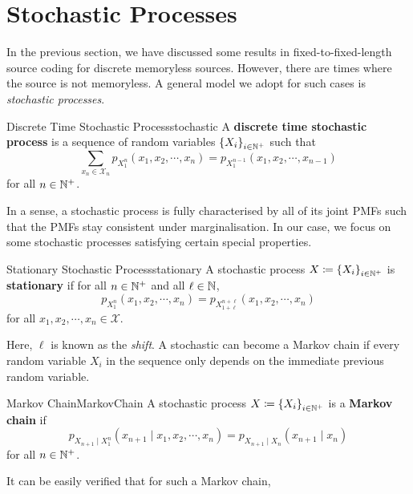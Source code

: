 \documentclass[math]{amznotes}
\theoremstyle{remark}
\begin{document}
\section{Stochastic Processes}
In the previous section, we have discussed some results in fixed-to-fixed-length source coding for discrete memoryless sources. However, there are times where the source is not memoryless. A general model we adopt for such cases is \textit{stochastic processes}.
\begin{dfnbox}{Discrete Time Stochastic Process}{stochastic}
    A {\color{red} \textbf{discrete time stochastic process}} is a sequence of random variables $\left\{X_i\right\}_{i \in \mathbb{N}^+}$ such that 
    \begin{equation*}
        \sum_{x_n \in \mathcal{X}_n}p_{X_1^n}\left(x_1, x_2, \cdots, x_n\right) = p_{X_1^{n - 1}}\left(x_1, x_2, \cdots, x_{n - 1}\right)
    \end{equation*}
    for all $n \in \mathbb{N}^+$.
\end{dfnbox}
In a sense, a stochastic process is fully characterised by all of its joint PMFs such that the PMFs stay consistent under marginalisation. In our case, we focus on some stochastic processes satisfying certain special properties.
\begin{dfnbox}{Stationary Stochastic Process}{stationary}
    A stochastic process $X \coloneqq \left\{X_i\right\}_{i \in \mathbb{N}^+}$ is {\color{red} \textbf{stationary}} if for all $n \in \mathbb{N}^+$ and all $\ell \in \mathbb{N}$, 
    \begin{equation*}
        p_{X_1^n}\left(x_1, x_2, \cdots, x_n\right) = p_{X_{1 + \ell}^{n + \ell}}\left(x_1, x_2, \cdots, x_n\right)
    \end{equation*}
    for all $x_1, x_2, \cdots, x_n \in \mathcal{X}$.
\end{dfnbox}
Here, $\ell$ is known as the \textit{shift}. A stochastic can become a Markov chain if every random variable $X_i$ in the sequence only depends on the immediate previous random variable.
\begin{dfnbox}{Markov Chain}{MarkovChain}
    A stochastic process $X \coloneqq \left\{X_i\right\}_{i \in \mathbb{N}^+}$ is a {\color{red} \textbf{Markov chain}} if 
    \begin{equation*}
        p_{X_{n + 1} \mid X_1^n}\left(x_{n + 1} \mid x_1, x_2, \cdots, x_n\right) = p_{X_{n + 1} \mid X_n}\left(x_{n + 1} \mid x_n\right)
    \end{equation*}
    for all $n \in \mathbb{N}^+$.
\end{dfnbox}
It can be easily verified that for such a Markov chain,
\end{document}
